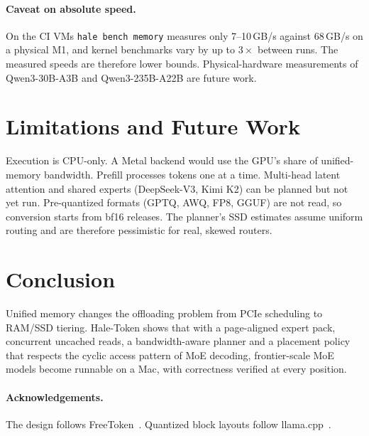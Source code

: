 \documentclass[11pt]{article}
\begin{document}
\paragraph{Caveat on absolute speed.} On the CI VMs \texttt{hale bench memory} measures only
7--10\,GB/s against 68\,GB/s on a physical M1, and kernel benchmarks vary by up to
$3\times$ between runs. The measured speeds are therefore lower bounds. Physical-hardware
measurements of Qwen3-30B-A3B and Qwen3-235B-A22B are future work.

\section{Limitations and Future Work}

Execution is CPU-only. A Metal backend would use the GPU's share of unified-memory bandwidth.
Prefill processes tokens one at a time. Multi-head latent attention and shared experts
(DeepSeek-V3, Kimi K2) can be planned but not yet run. Pre-quantized formats (GPTQ, AWQ, FP8,
GGUF) are not read, so conversion starts from bf16 releases. The planner's SSD estimates
assume uniform routing and are therefore pessimistic for real, skewed routers.

\section{Conclusion}

Unified memory changes the offloading problem from PCIe scheduling to RAM/SSD tiering.
Hale-Token shows that with a page-aligned expert pack, concurrent uncached reads, a
bandwidth-aware planner and a placement policy that respects the cyclic access pattern of
MoE decoding, frontier-scale MoE models become runnable on a Mac, with correctness verified
at every position.

\paragraph{Acknowledgements.} The design follows FreeToken~\cite{freetoken2026}. Quantized block
layouts follow llama.cpp~\cite{llamacpp}.



\end{document}

